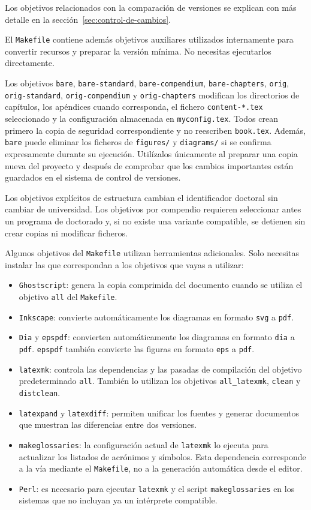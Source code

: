 Los objetivos relacionados con la comparación de versiones se explican con más detalle en la sección~\ref{sec:control-de-cambios}.

El \texttt{Makefile} contiene además objetivos auxiliares utilizados internamente para convertir recursos y preparar la versión mínima. No necesitas ejecutarlos directamente.

Los objetivos \texttt{bare}, \texttt{bare-standard}, \texttt{bare-compendium}, \texttt{bare-chapters}, \texttt{orig}, \texttt{orig-standard}, \texttt{orig-compendium} y \texttt{orig-chapters} modifican los directorios de capítulos, los apéndices cuando corresponda, el fichero \texttt{content-*.tex} seleccionado y la configuración almacenada en \texttt{myconfig.tex}. Todos crean primero la copia de seguridad correspondiente y no reescriben \texttt{book.tex}. Además, \texttt{bare} puede eliminar los ficheros de \texttt{figures/} y \texttt{diagrams/} si se confirma expresamente durante su ejecución. Utilízalos únicamente al preparar una copia nueva del proyecto y después de comprobar que los cambios importantes están guardados en el sistema de control de versiones.

Los objetivos explícitos de estructura cambian el identificador doctoral sin cambiar de universidad. Los objetivos por compendio requieren seleccionar antes un programa de doctorado y, si no existe una variante compatible, se detienen sin crear copias ni modificar ficheros.

Algunos objetivos del \texttt{Makefile} utilizan herramientas adicionales. Solo necesitas instalar las que correspondan a los objetivos que vayas a utilizar:

\begin{itemize}
  \item \texttt{Ghostscript}: genera la copia comprimida del documento cuando se utiliza el objetivo \texttt{all} del \texttt{Makefile}.
  \item \texttt{Inkscape}: convierte automáticamente los diagramas en formato \texttt{svg} a \texttt{pdf}.
  \item \texttt{Dia} y \texttt{epspdf}: convierten automáticamente los diagramas en formato \texttt{dia} a \texttt{pdf}. \texttt{epspdf} también convierte las figuras en formato \texttt{eps} a \texttt{pdf}.
  \item \texttt{latexmk}: controla las dependencias y las pasadas de compilación del objetivo predeterminado \texttt{all}. También lo utilizan los objetivos \texttt{all\_latexmk}, \texttt{clean} y \texttt{distclean}.
  \item \texttt{latexpand} y \texttt{latexdiff}: permiten unificar los fuentes y generar documentos que muestran las diferencias entre dos versiones.
  \item \texttt{makeglossaries}: la configuración actual de \texttt{latexmk} lo ejecuta para actualizar los listados de acrónimos y símbolos. Esta dependencia corresponde a la vía mediante el \texttt{Makefile}, no a la generación automática desde el editor.
  \item \texttt{Perl}: es necesario para ejecutar \texttt{latexmk} y el script \texttt{makeglossaries} en los sistemas que no incluyan ya un intérprete compatible.
\end{itemize}

